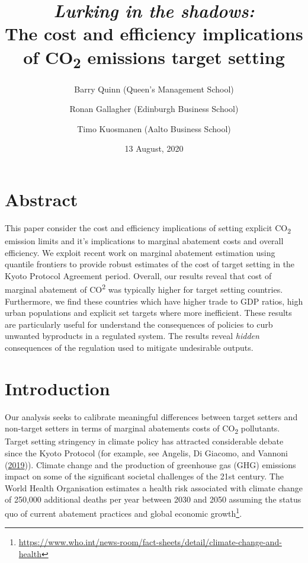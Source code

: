 \documentclass[12pt,]{article}
\title{\emph{Lurking in the shadows:}\\
The cost and efficiency implications of CO\textsubscript{2} emissions target setting}
\author{Barry Quinn (Queen's Management School) \and Ronan Gallagher (Edinburgh Business School) \and Timo Kuosmanen (Aalto Business School)}
\date{13 August, 2020}
\begin{document}
\maketitle

\hypertarget{abstract}{%
\section*{Abstract}\label{abstract}}

This paper consider the cost and efficiency implications of setting explicit CO\textsubscript{2} emission limits and it's implications to marginal abatement costs and overall efficiency. We exploit recent work on marginal abatement estimation using quantile frontiers to provide robust estimates of the cost of target setting in the Kyoto Protocol Agreement period. Overall, our results reveal that cost of marginal abatement of CO\textsuperscript{2} was typically higher for target setting countries. Furthermore, we find these countries which have higher trade to GDP ratios, high urban populations and explicit set targets where more inefficient. These results are particularly useful for understand the consequences of policies to curb unwanted byproducts in a regulated system. The results reveal \emph{hidden} consequences of the regulation used to mitigate undesirable outputs.

\hypertarget{introduction}{%
\section{Introduction}\label{introduction}}

Our analysis seeks to calibrate meaningful differences between target setters and non-target setters in terms of marginal abatements costs of CO\textsubscript{2} pollutants. Target setting stringency in climate policy has attracted considerable debate since the Kyoto Protocol (for example, see Angelis, Di Giacomo, and Vannoni (\protect\hyperlink{ref-De_Angelis2019}{2019})). Climate change and the production of greenhouse gas (GHG) emissions impact on some of the significant societal challenges of the 21st century. The World Health Organisation estimates a health risk associated with climate change of 250,000 additional deaths per year between 2030 and 2050 assuming the status quo of current abatement practices and global economic growth\footnote{\url{https://www.who.int/news-room/fact-sheets/detail/climate-change-and-health}}.
\end{document}
